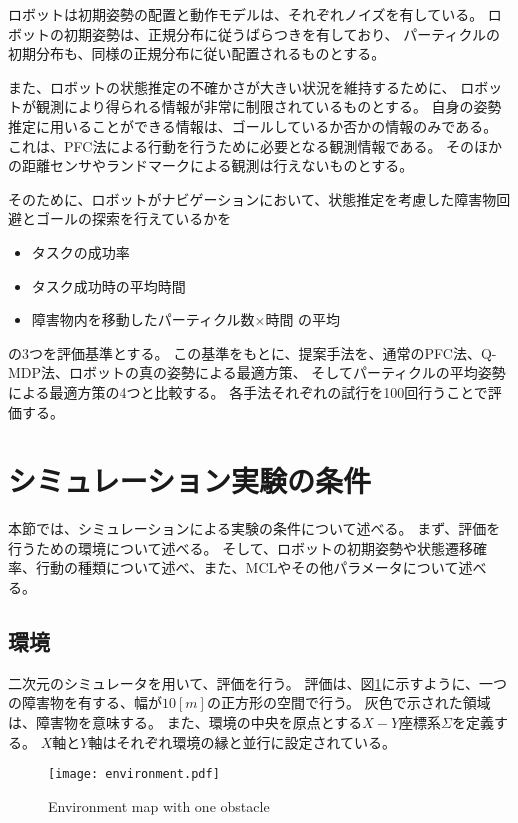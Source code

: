 ロボットは初期姿勢の配置と動作モデルは、それぞれノイズを有している。
ロボットの初期姿勢は、正規分布に従うばらつきを有しており、
パーティクルの初期分布も、同様の正規分布に従い配置されるものとする。

また、ロボットの状態推定の不確かさが大きい状況を維持するために、
ロボットが観測により得られる情報が非常に制限されているものとする。
自身の姿勢推定に用いることができる情報は、ゴールしているか否かの情報のみである。
これは、PFC法による行動を行うために必要となる観測情報である。
そのほかの距離センサやランドマークによる観測は行えないものとする。

そのために、ロボットがナビゲーションにおいて、状態推定を考慮した障害物回避とゴールの探索を行えているかを
\begin{itemize}
  \item タスクの成功率
  \item タスク成功時の平均時間
  \item 障害物内を移動したパーティクル数×時間 の平均
\end{itemize}
の3つを評価基準とする。
この基準をもとに、提案手法を、通常のPFC法、Q-MDP法、ロボットの真の姿勢による最適方策、
そしてパーティクルの平均姿勢による最適方策の4つと比較する。
各手法それぞれの試行を100回行うことで評価する。


\section{シミュレーション実験の条件} \label{section:実験条件}
本節では、シミュレーションによる実験の条件について述べる。
まず、評価を行うための環境について述べる。
そして、ロボットの初期姿勢や状態遷移確率、行動の種類について述べ、また、MCLやその他パラメータについて述べる。

\subsection{環境}
二次元のシミュレータを用いて、評価を行う。
評価は、図\ref{fig:environment}に示すように、一つの障害物を有する、幅が$10[\si{m}]$の正方形の空間で行う。
灰色で示された領域は、障害物を意味する。
また、環境の中央を原点とする$X-Y$座標系$\Sigma$を定義する。
$X$軸と$Y$軸はそれぞれ環境の縁と並行に設定されている。
\begin{figure}[h]
  \begin{center}
    \texttt{[image: environment.pdf]}
    \caption{Environment map with one obstacle}
    \label{fig:environment}
  \end{center}
\end{figure}

